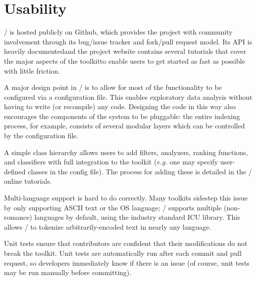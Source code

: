 \section{Usability}

\meta/ is hosted publicly on Github\footnotemark[1], which provides
the project with community involvement through its bug/issue tracker and
fork/pull request model. Its API is heavily documented\footnotemark[2] and the
project website contains several tutorials that cover the major aspects of
the toolkit\footnotemark[3] to enable users to get started as fast as
possible with little friction.


A major design point in \meta/ is to allow for most of the functionality to be
configured via a configuration file. This enables exploratory data analysis
without having to write (or recompile) any code. Designing the code in this way
also encourages the components of the system to be pluggable: the entire
indexing process, for example, consists of several modular layers which can be
controlled by the configuration file.

A simple class hierarchy allows users to add filters, analyzers, ranking
functions, and classifiers with full integration to the toolkit (\emph{e.g.} one
may specify user-defined classes in the config file). The process for adding
these is detailed in the \meta/ online tutorials.

Multi-language support is hard to do correctly. Many toolkits sidestep this
issue by only supporting ASCII text or the OS language; \meta/ supports multiple
(non-romance) languages by default, using the industry standard ICU
library\footnotemark[4]. This allows \meta/ to tokenize arbitrarily-encoded text
in nearly any language.


Unit tests ensure that contributors are confident that their modifications do
not break the toolkit. Unit tests are automatically run after each commit and
pull request, so developers immediately know if there is an issue (of course,
unit tests may be run manually before committing).
